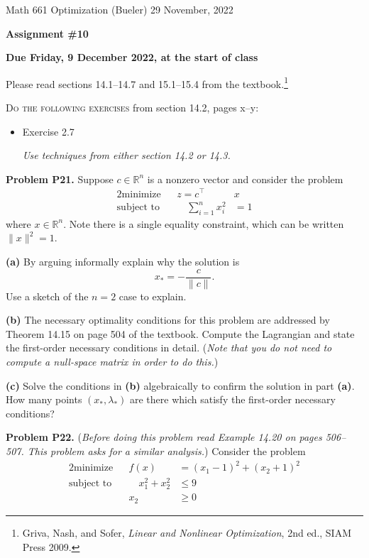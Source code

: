 \documentclass[12pt]{amsart}
\newcommand{\RR}{\mathbb{R}}
\newcommand{\prob}[1]{\bigskip\noindent\textbf{#1}\quad }
\newcommand{\epart}[1]{\medskip\noindent\textbf{(#1)}\quad }
\begin{document}
\scriptsize \noindent Math 661 Optimization (Bueler) \hfill 29 November, 2022
\normalsize

\medskip\bigskip

\Large\centerline{\textbf{Assignment \#10}}
\large
\bigskip

\centerline{\textbf{Due Friday, 9 December 2022, at the start of class}}
\bigskip
\normalsize

\thispagestyle{empty}

\bigskip
Please read sections 14.1--14.7 and 15.1--15.4 from the textbook.\footnote{Griva, Nash, and Sofer, \emph{Linear and Nonlinear Optimization}, 2nd ed., SIAM Press 2009.}

\bigskip
\noindent \textsc{Do the following exercises} from section 14.2, pages x--y:

\begin{itemize}
\item Exercise 2.7 \quad \begin{minipage}[t]{4.5in} \emph{Use techniques from either section 14.2 or 14.3.} \end{minipage}
\end{itemize}

\medskip
\prob{Problem P21.} Suppose $c\in\RR^n$ is a nonzero vector and consider the problem
\begin{alignat*}{2}
    \text{minimize}   &&  z = c^\top &x \\
    \text{subject to} && \quad \sum_{i=1}^n x_i^2 &= 1
\end{alignat*}
where $x\in\RR^n$.  Note there is a single equality constraint, which can be written $\|x\|^2=1$.

\epart{a}  By arguing informally explain why the solution is
    $$x_* = - \frac{c}{\|c\|}.$$
Use a sketch of the $n=2$ case to explain.

\epart{b}  The necessary optimality conditions for this problem are addressed by Theorem 14.15 on page 504 of the textbook.  Compute the Lagrangian and state the first-order necessary conditions in detail.  (\emph{Note that you do \emph{not} need to compute a null-space matrix in order to do this.})

\epart{c}  Solve the conditions in \textbf{(b)} algebraically to confirm the solution in part \textbf{(a)}.  How many points $(x_*,\lambda_*)$ are there which satisfy the first-order necessary conditions?


\medskip
\prob{Problem P22.}  (\emph{Before doing this problem read Example 14.20 on pages 506--507.  This problem asks for a similar analysis.})  Consider the problem
\begin{alignat*}{2}
    \text{minimize}   &&  f(x) &= (x_1-1)^2 + (x_2+1)^2 \\
    \text{subject to} && \quad x_1^2 + x_2^2 &\le 9 \\
                      &&        x_2 &\ge 0
\end{alignat*}
\end{document}
